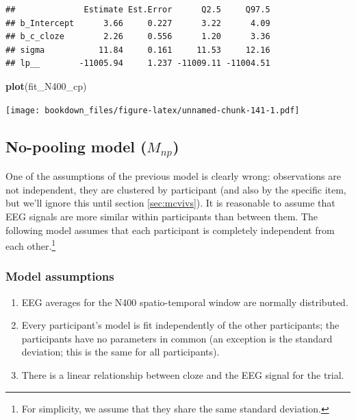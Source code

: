 \documentclass[12pt,]{krantz}
\newenvironment{Shaded}{\begin{snugshade}}{\end{snugshade}}
\newcommand{\KeywordTok}[1]{\textcolor[rgb]{0.13,0.29,0.53}{\textbf{#1}}}
\newcommand{\NormalTok}[1]{#1}
\providecommand{\tightlist}{%
  \setlength{\itemsep}{0pt}\setlength{\parskip}{0pt}}
\theoremstyle{definition}
\theoremstyle{definition}
\theoremstyle{definition}
\theoremstyle{remark}
\begin{document}
\begin{verbatim}
##              Estimate Est.Error      Q2.5     Q97.5
## b_Intercept      3.66     0.227      3.22      4.09
## b_c_cloze        2.26     0.556      1.20      3.36
## sigma           11.84     0.161     11.53     12.16
## lp__        -11005.94     1.237 -11009.11 -11004.51
\end{verbatim}

\begin{Shaded}
\begin{Highlighting}[]
\KeywordTok{plot}\NormalTok{(fit_N400_cp)}
\end{Highlighting}
\end{Shaded}

\texttt{[image: bookdown\_files/figure-latex/unnamed-chunk-141-1.pdf]}

\hypertarget{no-pooling-model-m_np}{%
\subsection{\texorpdfstring{No-pooling model (\(M_{np}\))}{No-pooling model (M\_\{np\})}}\label{no-pooling-model-m_np}}

One of the assumptions of the previous model is clearly wrong: observations are not independent, they are clustered by participant (and also by the specific item, but we'll ignore this until section \ref{sec:mcvivs}). It is reasonable to assume that EEG signals are more similar within participants than between them. The following model assumes that each participant is completely independent from each other.\footnote{For simplicity, we assume that they share the same standard deviation.}

\hypertarget{model-assumptions-1}{%
\subsubsection{Model assumptions}\label{model-assumptions-1}}

\begin{enumerate}
\def\labelenumi{\arabic{enumi}.}
\tightlist
\item
  EEG averages for the N400 spatio-temporal window are normally distributed.
\item
  Every participant's model is fit independently of the other participants; the participants have no parameters in common (an exception is the standard deviation; this is the same for all participants).
\item
  There is a linear relationship between cloze and the EEG signal for the trial.
\end{enumerate}
\end{document}
